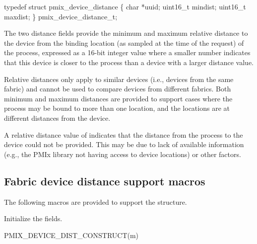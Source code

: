 \cspecificstart
\begin{codepar}
typedef struct pmix_device_distance \{
    char *uuid;
    uint16_t mindist;
    uint16_t maxdist;
\} pmix_device_distance_t;
\end{codepar}
\cspecificend

The two distance fields provide the minimum and maximum relative distance to the device from the binding location (as sampled at the time of the request) of the process, expressed as a 16-bit integer value where a smaller number indicates that this device is closer to the process than a device with a larger distance value.

Relative distances only apply to similar devices (i.e., devices from the same fabric) and cannot be used to compare devices from different fabrics. Both minimum and maximum distances are provided to support cases where the process may be bound to more than one location, and the locations are at different distances from the device.

A relative distance value of  indicates that the distance from the process to the device could not be provided. This may be due to lack of available information (e.g., the \ac{PMIx} library not having access to device locations) or other factors.


\subsection{Fabric device distance support macros}
\label{api:netenddist:macros}

The following macros are provided to support the  structure.


Initialize the  fields.

\cspecificstart
\begin{codepar}
PMIX_DEVICE_DIST_CONSTRUCT(m)
\end{codepar}
\cspecificend

\begin{arglist}
\end{arglist}


